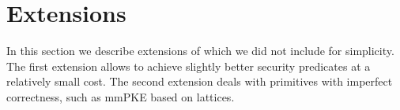 
\section{Extensions}
In this section we describe extensions of \saik which we did not include for simplicity. The first extension allows to achieve slightly better security predicates at a relatively small cost. The second extension deals with primitives with imperfect correctness, such as mmPKE based on lattices.





